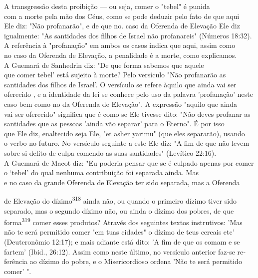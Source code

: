 \begin{itemize}
\begin{enumrate}
\begin{itemize}
\begin{itemize}
\begin{itemize}
A transgressão desta proibição --- ou seja, comer o "tebel" é punida\\
com a morte pela mão dos Céus, como se pode deduzir pelo fato de que
aqui\\
Ele diz: "Não profanarão", e de que no. caso da Oferenda de Elevação Ele
diz\\
igualmente: "As santidades dos filhos de Israel não profanareis"
(Números 18:32).\\
A referência à "profanação" em ambos os casos indica que aqui, assim
como\\
no caso da Oferenda de Elevação, a penalidade é a morte, como
explicamos.\\
A Guemará de Sanhedrin diz: "De que forma sabemos que aquele\\
que comer tebel' está sujeito à morte? Pelo versículo "Não profanarão as
santidades
dos filhos de Israel'. O versículo se refere àquilo que ainda vai
ser oferecido
, e a identidade da lei se conhece pelo uso da palavra 'profanação'
neste\\
caso bem como no da Oferenda de Elevação". A expressão "aquilo que
ainda\\
vai ser oferecido" significa que é como se Ele tivesse dito: "Não deves
profanar
as santidades que as pessoas 'ainda vão separar' para o Eterno". É
por isso\\
que Ele diz, enaltecido seja Ele, "et asher yarimu" (que eles
separarão), usando\\
o verbo no futuro. No versículo seguinte a este Ele diz: "A fim de que
não levem
sobre si delito de culpa comendo as suas santidades" (Levítico
22:16).\\
A Guemará de Macot diz: "Eu poderia pensar que se é culpado apenas
por comer o `tebel' do qual nenhuma contribuição foi separada ainda.
Mas\\
e no caso da grande Oferenda de Elevação ter sido separada, mas a
Oferenda



de Elevação do dízimo\textsuperscript{318} ainda não, ou quando o
primeiro dízimo tiver sido separado, mas o segundo dízimo não, ou ainda
o dízimo dos pobres, de que forma\textsuperscript{319} comer esses
produtos? Através dos seguintes textos instrutivos: 'Mas não te será
permitido comer "em tuas cidades" o dízimo de teus cereais etc'
(Deuteronômio 12:17); e mais adiante está dito: 'A fim de que os comam e
se fartem' (Ibid., 26:12). Assim como neste último, no versículo
anterior faz-se re­ferência ao dízimo do pobre, e o Misericordioso
ordena 'Não te será permitido comer' ".


\end{itemize}
\end{itemize}
\end{itemize}
\end{enumrate}
\end{itemize}
